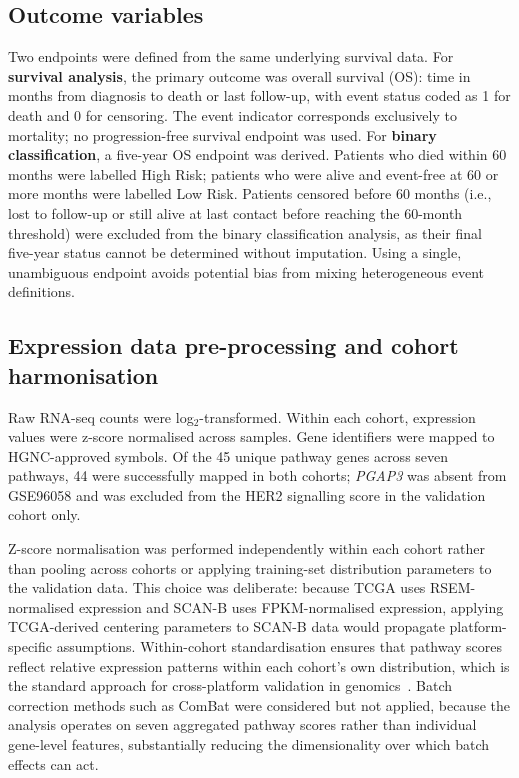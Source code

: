 \documentclass[review,12pt]{elsarticle}
\newcommand{\gene}[1]{\textit{#1}}
\begin{document}
\subsection{Outcome variables}
\label{sec:outcomes}

Two endpoints were defined from the same underlying survival data.  For
\textbf{survival analysis}, the primary outcome was overall survival
(OS): time in months from diagnosis to death or last follow-up, with
event status coded as 1 for death and 0 for censoring.  The event
indicator corresponds exclusively to mortality; no progression-free
survival endpoint was used.  For \textbf{binary classification}, a five-year OS endpoint was derived.
Patients who died within 60 months were labelled High Risk; patients who
were alive and event-free at 60 or more months were labelled Low Risk.
Patients censored before 60 months (i.e., lost to follow-up or still
alive at last contact before reaching the 60-month threshold) were
excluded from the binary classification analysis, as their final
five-year status cannot be determined without imputation.  Using a single,
unambiguous endpoint avoids potential bias from mixing heterogeneous event
definitions.

\subsection{Expression data pre-processing and cohort harmonisation}
\label{sec:preproc}

Raw RNA-seq counts were log$_2$-transformed.  Within each cohort,
expression values were z-score normalised across samples.  Gene
identifiers were mapped to HGNC-approved symbols.  Of the 45 unique
pathway genes across seven pathways, 44 were successfully mapped in both
cohorts; \gene{PGAP3} was absent from GSE96058 and was excluded from the
HER2 signalling score in the validation cohort only.

Z-score normalisation was performed independently within each cohort
rather than pooling across cohorts or applying training-set
distribution parameters to the validation data.  This choice was
deliberate: because TCGA uses RSEM-normalised expression and SCAN-B
uses FPKM-normalised expression, applying TCGA-derived centering
parameters to SCAN-B data would propagate platform-specific assumptions.
Within-cohort standardisation ensures that pathway scores reflect
relative expression patterns within each cohort's own distribution, which
is the standard approach for cross-platform validation in
genomics~\citep{saal2015}.  Batch correction methods such as ComBat were
considered but not applied, because the analysis operates on seven
aggregated pathway scores rather than individual gene-level features,
substantially reducing the dimensionality over which batch effects can
act.
\end{document}
